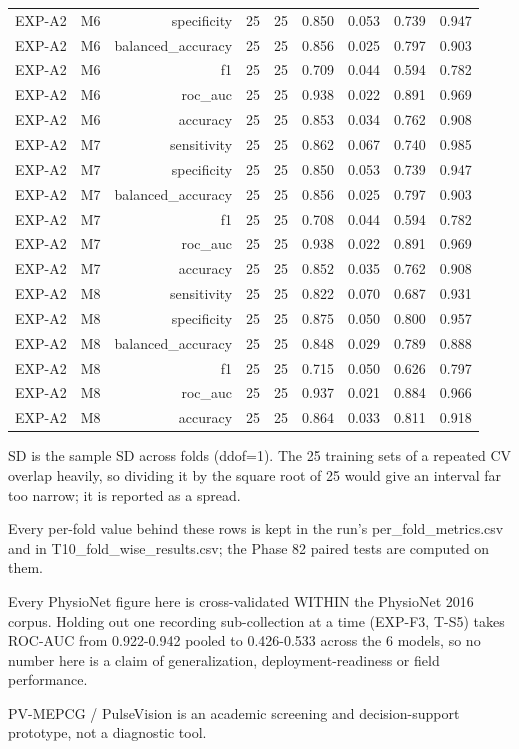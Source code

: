 \begin{table}[htbp]
\begin{tabular}{lrrrrrrrr}
    EXP-A2 & M6 & specificity & 25 & 25 & 0.850 & 0.053 & 0.739 & 0.947 \\
    EXP-A2 & M6 & balanced\_accuracy & 25 & 25 & 0.856 & 0.025 & 0.797 & 0.903 \\
    EXP-A2 & M6 & f1 & 25 & 25 & 0.709 & 0.044 & 0.594 & 0.782 \\
    EXP-A2 & M6 & roc\_auc & 25 & 25 & 0.938 & 0.022 & 0.891 & 0.969 \\
    EXP-A2 & M6 & accuracy & 25 & 25 & 0.853 & 0.034 & 0.762 & 0.908 \\
    EXP-A2 & M7 & sensitivity & 25 & 25 & 0.862 & 0.067 & 0.740 & 0.985 \\
    EXP-A2 & M7 & specificity & 25 & 25 & 0.850 & 0.053 & 0.739 & 0.947 \\
    EXP-A2 & M7 & balanced\_accuracy & 25 & 25 & 0.856 & 0.025 & 0.797 & 0.903 \\
    EXP-A2 & M7 & f1 & 25 & 25 & 0.708 & 0.044 & 0.594 & 0.782 \\
    EXP-A2 & M7 & roc\_auc & 25 & 25 & 0.938 & 0.022 & 0.891 & 0.969 \\
    EXP-A2 & M7 & accuracy & 25 & 25 & 0.852 & 0.035 & 0.762 & 0.908 \\
    EXP-A2 & M8 & sensitivity & 25 & 25 & 0.822 & 0.070 & 0.687 & 0.931 \\
    EXP-A2 & M8 & specificity & 25 & 25 & 0.875 & 0.050 & 0.800 & 0.957 \\
    EXP-A2 & M8 & balanced\_accuracy & 25 & 25 & 0.848 & 0.029 & 0.789 & 0.888 \\
    EXP-A2 & M8 & f1 & 25 & 25 & 0.715 & 0.050 & 0.626 & 0.797 \\
    EXP-A2 & M8 & roc\_auc & 25 & 25 & 0.937 & 0.021 & 0.884 & 0.966 \\
    EXP-A2 & M8 & accuracy & 25 & 25 & 0.864 & 0.033 & 0.811 & 0.918 \\
    \bottomrule
  \end{tabular}
  \par\footnotesize SD is the sample SD across folds (ddof=1). The 25 training sets of a repeated CV overlap heavily, so dividing it by the square root of 25 would give an interval far too narrow; it is reported as a spread.
  \par\footnotesize Every per-fold value behind these rows is kept in the run's per\_fold\_metrics.csv and in T10\_fold\_wise\_results.csv; the Phase 82 paired tests are computed on them.
  \par\footnotesize Every PhysioNet figure here is cross-validated WITHIN the PhysioNet 2016 corpus. Holding out one recording sub-collection at a time (EXP-F3, T-S5) takes ROC-AUC from 0.922-0.942 pooled to 0.426-0.533 across the 6 models, so no number here is a claim of generalization, deployment-readiness or field performance.
  \par\footnotesize PV-MEPCG / PulseVision is an academic screening and decision-support prototype, not a diagnostic tool.
\end{table}
